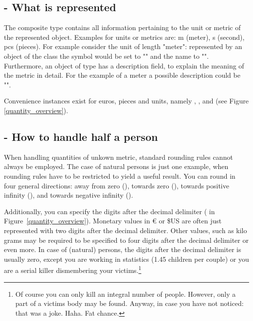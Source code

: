 \subsection{ - What is represented}
The composite type  contains all information pertaining to the unit or metric of the represented object.
Examples for units or metrics are: m (meter), s (second), pcs (pieces).
For example consider the unit of length "meter": represented by an object of the class  the symbol would be set to "" and the name to "".
Furthermore, an object of type  has a description field, to explain the meaning of the metric in detail.
For the example of a meter a possible description could be "".

Convenience instances exist for euros, pieces and units, namely , , and  (see Figure \ref{quantity_overview}).

\subsection{ - How to handle half a person}
When handling quantities of unkown metric, standard rounding rules cannot always be employed.
The case of natural persons is just one example, when rounding rules have to be restricted to yield a useful result.
You can round in four general directions: away from zero (), towards zero (), towards positive infinity (), and towards negative infinity ().

Additionally, you can specify the digits after the decimal delimiter ( in Figure~\ref{quantity_overview}).
Monetary values in \euro{} or \$US are often just represented with two digits after the decimal delimiter.
Other values, such as kilo grams may be required to be specified to four digits after the decimal delimiter or even more.
In case of (natural) persons, the digits after the decimal delimiter is usually zero, except you are working in statistics (1.45 children per couple) or you are a serial killer dismembering your victims.\footnote{Of course you can only kill an integral number of people. However, only a part of a victims body may be found. Anyway, in case you have not noticed: that was a joke. Haha. Fat chance.}

